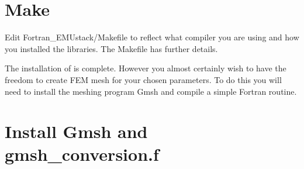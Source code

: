 \documentclass[11pt,a4paper,twoside]{report}
\begin{document}
\section{Make \CodeName}

Edit Fortran\_EMUstack/Makefile to reflect what compiler you are using and how you installed the libraries.
The Makefile has further details.




The installation of \CodeName is complete.
However you almost certainly wish to have the freedom to create FEM mesh for your chosen parameters. To do this you will need to install the meshing program Gmsh and compile a simple Fortran routine.




\section{Install Gmsh and gmsh\_conversion.f}
\end{document}
